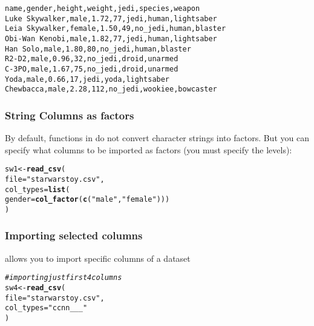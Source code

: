 \documentclass[12pt]{beamer}\usepackage[]{graphicx}\usepackage[]{color}
\makeatletter
\newcommand{\hlstr}[1]{\textcolor[rgb]{0.192,0.494,0.8}{#1}}%
\newcommand{\hlcom}[1]{\textcolor[rgb]{0.678,0.584,0.686}{\textit{#1}}}%
\newcommand{\hlstd}[1]{\textcolor[rgb]{0.345,0.345,0.345}{#1}}%
\newcommand{\hlkwb}[1]{\textcolor[rgb]{0.69,0.353,0.396}{#1}}%
\newcommand{\hlkwc}[1]{\textcolor[rgb]{0.333,0.667,0.333}{#1}}%
\newcommand{\hlkwd}[1]{\textcolor[rgb]{0.737,0.353,0.396}{\textbf{#1}}}%
\newenvironment{kframe}{%
 \def\at@end@of@kframe{}%
 \ifinner\ifhmode%
  \def\at@end@of@kframe{\end{minipage}}%
  \begin{minipage}{\columnwidth}%
 \fi\fi%
 \def\FrameCommand##1{\hskip\@totalleftmargin \hskip-\fboxsep
 \colorbox{shadecolor}{##1}\hskip-\fboxsep
     \hskip-\linewidth \hskip-\@totalleftmargin \hskip\columnwidth}%
 \MakeFramed {\advance\hsize-\width
   \@totalleftmargin\z@ \linewidth\hsize
   \@setminipage}}%
 {\par\unskip\endMakeFramed%
 \at@end@of@kframe}
\newenvironment{knitrout}{}{} %
\makeatother
\begin{document}

\begin{frame}[fragile]
\frametitle{}

{\small
\begin{verbatim}
name,gender,height,weight,jedi,species,weapon
Luke Skywalker,male,1.72,77,jedi,human,lightsaber
Leia Skywalker,female,1.50,49,no_jedi,human,blaster
Obi-Wan Kenobi,male,1.82,77,jedi,human,lightsaber
Han Solo,male,1.80,80,no_jedi,human,blaster
R2-D2,male,0.96,32,no_jedi,droid,unarmed
C-3PO,male,1.67,75,no_jedi,droid,unarmed
Yoda,male,0.66,17,jedi,yoda,lightsaber
Chewbacca,male,2.28,112,no_jedi,wookiee,bowcaster
\end{verbatim}
}

\end{frame}


\begin{frame}[fragile]
\frametitle{String Columns as factors}

By default, functions in  do not convert character strings into factors. But you can specify what columns to be imported as factors (you must specify the levels):
\begin{knitrout}\footnotesize
{}\color{fgcolor}\begin{kframe}
\begin{alltt}
\hlstd{sw1} \hlkwb{<-} \hlkwd{read_csv}\hlstd{(}
  \hlkwc{file} \hlstd{=} \hlstr{"starwarstoy.csv"}\hlstd{,}
  \hlkwc{col_types} \hlstd{=} \hlkwd{list}\hlstd{(}
    \hlkwc{gender} \hlstd{=} \hlkwd{col_factor}\hlstd{(}\hlkwd{c}\hlstd{(}\hlstr{"male"}\hlstd{,} \hlstr{"female"}\hlstd{)))}
\hlstd{)}
\end{alltt}
\end{kframe}
\end{knitrout}

\end{frame}


\begin{frame}[fragile]
\frametitle{Importing selected columns}

 allows you to import specific columns of a dataset
\begin{knitrout}\footnotesize
{}\color{fgcolor}\begin{kframe}
\begin{alltt}
\hlcom{# importing just first 4 columns}
\hlstd{sw4} \hlkwb{<-} \hlkwd{read_csv}\hlstd{(}
  \hlkwc{file} \hlstd{=} \hlstr{"starwarstoy.csv"}\hlstd{,}
  \hlkwc{col_types} \hlstd{=} \hlstr{"ccnn___"}
\hlstd{)}
\end{alltt}
\end{kframe}
\end{knitrout}

\end{frame}
\end{document}
